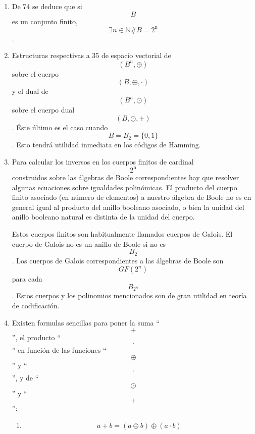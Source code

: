 \begin{enumerate}
\begin{enumerate}
\begin{enumerate}
      como en 34, sino otra estructura asociada de dominio de integridad
      / cuerpo. La po\-demos encontrar explícitamente en el álgebra de
      las partes de un conjunto finito. Sólo nos queda ver que
      \[\varphi\]es sobreyectivo. Tenemos que
      \[\varphi{\left( {\mathit{Atom}{(B)}} \right) = B}\]. Así
      \[\varphi\]pasa a ser un isomorfimo de álgebras de Boole: esto es,
      en lo que a la estructu\-ra de álgebra de Boole se refiere,
      haciendo abstracción de las operaciones \[+\] y \[\cdot\]concretas
      y los elementos concretos,
      \[{\langle{B,0,1, + , \cdot}\rangle} \cong {\langle{@\left( {\mathit{Atom}{(B)}} \right),\varnothing,\mathit{Atom}\left( B \right), \cup , \cap}\rangle}\].
    \item
      De 74 se deduce que si \[B\]es un conjunto finito,
      \[\exists{n \in \mathbb{N}}\#{B = 2^{\mathbf{\mathrm{n}}}}\].
    \item
      Estructuras respectivas a 35 de espacio vectorial
      de\[({B^{n}, \oplus})\]sobre el cuerpo \[({B, \oplus , \cdot})\] y
      el dual de \[({B^{n}, \odot})\]sobre el cuerpo dual
      \[({B, \odot , +})\]. Éste último es el caso cuando
      \[{B = B_{2}} = {\{ 0,1\}}\]. Esto tendrá utilidad inmediata en
      los códigos de Hamming.
    \item
      Para calcular los inversos en los cuerpos finitos de cardinal
      \[2^{\mathbf{\mathrm{n}}}\] construidos sobre las álgebras de
      Boole correspondientes hay que re\-solver algunas ecuaciones sobre
      igualdades polinómicas. El producto del cuerpo fi\-nito asociado
      (en número de elementos) a nuestro álgebra de Boole no es en
      general igual al producto del ani\-llo booleano asociado, o bien
      la unidad del anillo booleano natural es distinta de la unidad del
      cuerpo.

      Estos cuerpos finitos son habitualmente llamados cuerpos de
      Galois. El cuerpo de Galois no es un anillo de Boole si no es
      \[B_{2}\]. Los cuerpos de Galois correspondientes a las álgebras
      de Boole son \[\mathit{GF}{(2^{n})}\]para cada \[B_{2^{n}}\].
      Estos cuerpos y los polinomios mencionados son de gran utilidad en
      teoría de codificación.
    \item
      Existen formulas sencillas para poner la suma ``\[+\]'', el
      producto ``\[\cdot\]'' en fun\-ción de las funciones
      ``\[\oplus\]'' y ``\[\cdot\]'', y de ``\[\odot\]'' y ``\[+\]'':

      \begin{enumerate}
      \def\labelenumiv{\arabic{enumiv}.}
      \item
        \[{{a + b} = {({a \oplus b})}} \oplus {({a \cdot b})}\]


\end{enumerate}
\end{enumerate}
\end{enumerate}
\end{enumerate}
